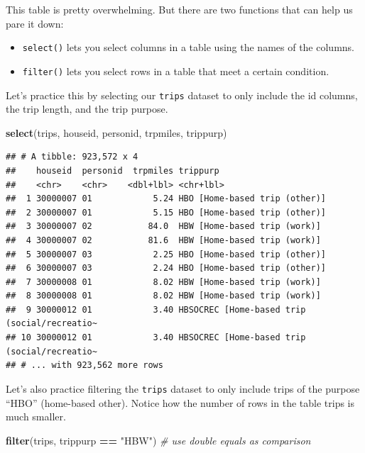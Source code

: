 \documentclass[
]{book}
\newenvironment{Shaded}{\begin{snugshade}}{\end{snugshade}}
\newcommand{\CommentTok}[1]{\textcolor[rgb]{0.56,0.35,0.01}{\textit{#1}}}
\newcommand{\KeywordTok}[1]{\textcolor[rgb]{0.13,0.29,0.53}{\textbf{#1}}}
\newcommand{\NormalTok}[1]{#1}
\newcommand{\OperatorTok}[1]{\textcolor[rgb]{0.81,0.36,0.00}{\textbf{#1}}}
\newcommand{\StringTok}[1]{\textcolor[rgb]{0.31,0.60,0.02}{#1}}
\providecommand{\tightlist}{%
  \setlength{\itemsep}{0pt}\setlength{\parskip}{0pt}}
\begin{document}
This table is pretty overwhelming. But there are two functions that can help
us pare it down:

\begin{itemize}
\tightlist
\item
  \texttt{select()} lets you select columns in a table using the names of the columns.
\item
  \texttt{filter()} lets you select rows in a table that meet a certain condition.
\end{itemize}

Let's practice this by selecting our \texttt{trips} dataset to only include the id
columns, the trip length, and the trip purpose.

\begin{Shaded}
\begin{Highlighting}[]
\KeywordTok{select}\NormalTok{(trips, houseid, personid, trpmiles, trippurp)}
\end{Highlighting}
\end{Shaded}

\begin{verbatim}
## # A tibble: 923,572 x 4
##    houseid  personid  trpmiles trippurp                                    
##    <chr>    <chr>    <dbl+lbl> <chr+lbl>                                   
##  1 30000007 01            5.24 HBO [Home-based trip (other)]               
##  2 30000007 01            5.15 HBO [Home-based trip (other)]               
##  3 30000007 02           84.0  HBW [Home-based trip (work)]                
##  4 30000007 02           81.6  HBW [Home-based trip (work)]                
##  5 30000007 03            2.25 HBO [Home-based trip (other)]               
##  6 30000007 03            2.24 HBO [Home-based trip (other)]               
##  7 30000008 01            8.02 HBW [Home-based trip (work)]                
##  8 30000008 01            8.02 HBW [Home-based trip (work)]                
##  9 30000012 01            3.40 HBSOCREC [Home-based trip (social/recreatio~
## 10 30000012 01            3.40 HBSOCREC [Home-based trip (social/recreatio~
## # ... with 923,562 more rows
\end{verbatim}

Let's also practice filtering the \texttt{trips} dataset to only include trips
of the purpose ``HBO'' (home-based other). Notice how the number of rows
in the table trips is much smaller.

\begin{Shaded}
\begin{Highlighting}[]
\KeywordTok{filter}\NormalTok{(trips, trippurp }\OperatorTok{==}\StringTok{ "HBW"}\NormalTok{) }\CommentTok{# use double equals as comparison}
\end{Highlighting}
\end{Shaded}
\end{document}
